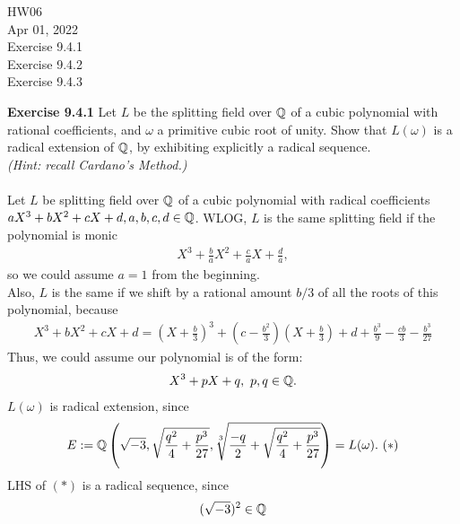 \documentclass{article}
\begin{document}
\maketitle
HW06 \\
Apr 01, 2022 \\
Exercise 9.4.1\\
Exercise 9.4.2\\
Exercise 9.4.3\\
\pagebreak

\begin{homeworkProblem}
    \textbf{Exercise 9.4.1} Let $L$ be the splitting field over $\mathbb{Q}$ of a cubic polynomial with rational coefficients,
    and $\omega$ a primitive cubic root of unity. Show that $L(\omega)$ is a radical extension of $\mathbb{Q}$, by exhibiting explicitly a radical sequence.\\
    \textit{(Hint: recall Cardano's Method.)}\\
    \solution \\
    Let $L$ be splitting field over $\mathbb{Q}$ of a cubic polynomial with radical coefficients $aX^3 + bX^2 + cX + d, a,b,c,d \in \mathbb{Q}$.
    WLOG, $L$ is the same splitting field if the polynomial is monic
    \begin{align}
        X^3 + \frac{ b }{ a }X^2 + \frac{ c }{ a }X + \frac{ d }{ a }, 
    \end{align}
    so we could assume $a=1$ from the beginning.\\
    Also, $L$ is the same if we shift by a rational amount $b/3$ of all the roots of this polynomial, because
    \begin{align}
        X^3 + b X^2 + cX+d=(X + \frac{ b }{ 3 })^3 + (c - \frac{ b^2 }{ 3 })(X + \frac{ b }{ 3 }) + d + \frac{ b^3 }{ 9 } - \frac{ cb }{ 3 } - \frac{ b^3 }{ 27 }
    \end{align}
    Thus, we could assume our polynomial is of the form:
    \begin{align}
        X^3 + pX + q, \ p,q \in \mathbb{Q}.
    \end{align}
    $L(\omega)$ is radical extension, since
    \begin{align}
        E := \mathbb{Q} \left(\sqrt{-3}, \sqrt{\frac{ q^2 }{ 4 }+\frac{ p^3 }{ 27 }}, \sqrt[3]{\frac{ -q }{ 2 } + \sqrt{\frac{ q^2 }{ 4 }+\frac{ p^3 }{ 27 }} } \right) = L(\omega). \ (*)
    \end{align}
    LHS of $(*)$ is a radical sequence, since 
    \begin{align}
        & ( \sqrt{-3})^2 \in \Q \\

\end{align}
\end{homeworkProblem}
\end{document}
